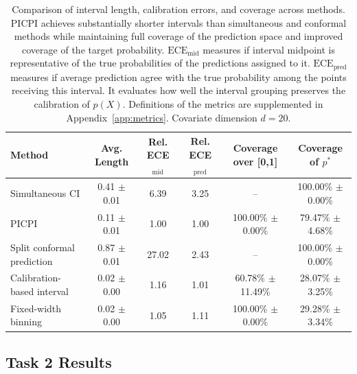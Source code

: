 \documentclass[11pt]{article}
\theoremstyle{statplain}
\theoremstyle{statdefinition}
\newcommand{\0}{\mathbf{0}}
\newcommand{\titleShort}{PICPI\xspace}
\begin{document}







\begin{table}[ht]
\centering
\scriptsize

\begin{tabular}{lccccc}

\toprule
Method & Avg. Length & Rel. ECE$_\text{mid}$ &  Rel. ECE$_\text{pred}$  & Coverage over [0,1] & Coverage of $p^*$ \\
\midrule
Simultaneous CI & 0.41 $\pm$ 0.01 & 6.39 & 3.25 & -- & 100.00\% $\pm$ 0.00\% \\
PICPI & 0.11 $\pm$ 0.01 & 1.00 & 1.00 & 100.00\% $\pm$ 0.00\% & 79.47\% $\pm$ 4.68\% \\
Split conformal prediction & 0.87 $\pm$ 0.01 & 27.02 & 2.43 & -- & 100.00\% $\pm$ 0.00\% \\
Calibration-based interval & 0.02 $\pm$ 0.00 & 1.16 & 1.01 & 60.78\% $\pm$ 11.49\% & 28.07\% $\pm$ 3.25\% \\
Fixed-width binning & 0.02 $\pm$ 0.00 & 1.05 & 1.11 & 100.00\% $\pm$ 0.00\% & 29.28\% $\pm$ 3.34\% \\
\bottomrule

\end{tabular}
\caption{Comparison of interval length, calibration errors, and coverage across methods. \titleShort achieves substantially shorter intervals than simultaneous and conformal methods while maintaining full coverage of the prediction space and improved coverage of the target probability.
$\mathrm{ECE_{mid}}$ measures if interval midpoint is representative of the true probabilities of the predictions assigned to it.
$\mathrm{ECE_{pred}}$ measures if average prediction agree with the true probability among the points receiving this interval. It evaluates how well the interval grouping preserves the calibration of $p(X)$. Definitions of the metrics are supplemented in Appendix~\ref{app:metrics}. Covariate dimension $d=20$. }%
\label{tab:task1_multivariate_mc_summary}
\end{table}



\subsection{Task 2 Results}
\end{document}
